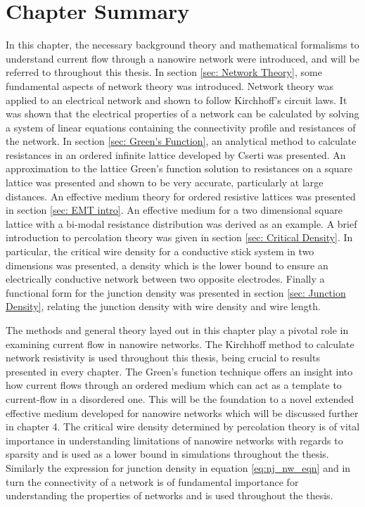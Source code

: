 \section{Chapter Summary}
\label{sec: Conclusion}
In this chapter, the necessary background theory and mathematical formalisms to understand current flow through a nanowire network were introduced, and will be referred to throughout this thesis. In section \ref{sec: Network Theory}, some fundamental aspects of network theory was introduced. Network theory was applied to an electrical network and shown to follow Kirchhoff's circuit laws. It was shown that the electrical properties of a network can be calculated by solving a system of linear equations containing the connectivity profile and resistances of the network. In section \ref{sec: Green's Function}, an analytical method to calculate resistances in an ordered infinite lattice developed by Cserti\cite{cserti2000} was presented. An approximation to the lattice Green's function solution to resistances on a square lattice was presented and shown to be very accurate, particularly at large distances. An effective medium theory for ordered resistive lattices was presented in section \ref{sec: EMT intro}. An effective medium for a two dimensional square lattice with a bi-modal resistance distribution was derived as an example. A brief introduction to percolation theory was given in section \ref{sec: Critical Density}. In particular, the critical wire density for a conductive stick system in two dimensions was presented, a density which is the lower bound to ensure an electrically conductive network between two opposite electrodes. Finally a functional form for the junction density was presented in section \ref{sec: Junction Density}, relating the junction density with wire density and wire length. 

The methods and general theory layed out in this chapter play a pivotal role in examining current flow in nanowire networks. The Kirchhoff method to calculate network resistivity is used throughout this thesis, being crucial to results presented in every chapter. The Green's function technique offers an insight into how current flows through an ordered medium which can act as a template to current-flow in a disordered one. This will be the foundation to a novel extended effective medium developed for nanowire networks which will be discussed further in chapter 4. The critical wire density determined by percolation theory is of vital importance in understanding limitations of nanowire networks with regards to sparsity and is used as a lower bound in simulations throughout the thesis. Similarly the expression for junction density in equation \ref{eq:nj_nw_eqn} and in turn the connectivity of a network is of fundamental importance for understanding the properties of networks and is used throughout the thesis. 
%
